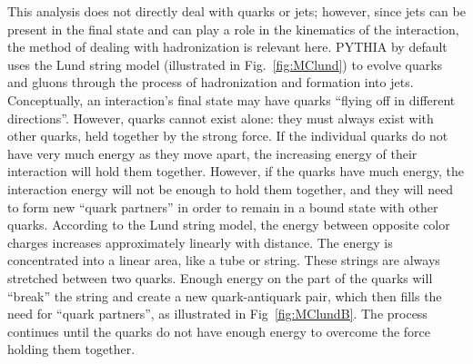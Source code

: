 This analysis does not directly deal with 
quarks or jets; 
however, since jets can be present in the final state 
and can play a role in the kinematics of the \Zee 
interaction, 
the method of dealing with hadronization 
is relevant here.  
PYTHIA by default uses the Lund string model 
\cite{LundString} 
(illustrated in Fig.~\ref{fig:MClund})
to evolve 
quarks and gluons through the process of hadronization 
and formation into jets. %
Conceptually, an interaction's final state may have 
quarks 
``flying off in different directions''.  
However, quarks cannot exist alone: %
they must always exist with other quarks, 
held together by the strong force.  
If the individual quarks do not have very much energy 
as they move apart, 
the increasing energy of their interaction 
will hold them together.  %
However, if the quarks have much energy, 
the interaction energy will not be enough to hold 
them together, 
and they will need to form new ``quark partners'' 
in order to 
remain in a bound state with other quarks.  
According to the Lund string model, 
the energy between opposite color charges 
increases approximately linearly with distance. 
The energy is concentrated into a linear area, 
like a tube or string.  
These strings are always stretched between two quarks.  
Enough energy on the part of the quarks will 
``break'' the string and 
create a new quark-antiquark pair, 
which then fills the need for ``quark partners'', 
as illustrated in Fig~\ref{fig:MClundB}.  
The process continues until the quarks 
do not have enough energy to overcome 
the force holding them together.  %

